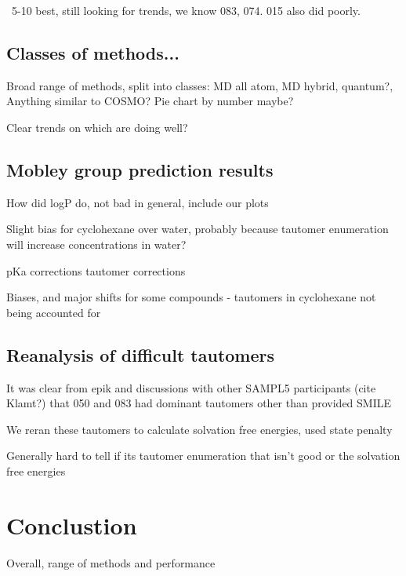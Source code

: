 ~5-10 best, still looking for trends, we know 083, 074. 015 also did poorly. 


\subsection{Classes of methods...}
\label{results:4}
Broad range of methods, split into classes: MD all atom, MD hybrid, quantum?, Anything similar to COSMO? %
Pie chart by number maybe?

Clear trends on which are doing well? 

\subsection{Mobley group prediction results}
\label{results:5}
How did logP do, not bad in general, include our plots

Slight bias for cyclohexane over water, probably because tautomer enumeration will increase concentrations in water?

pKa corrections
tautomer corrections

Biases, and major shifts for some compounds - tautomers in cyclohexane not being accounted for

\subsection{Reanalysis of difficult tautomers} %
\label{results:6}
It was clear from epik and discussions with other SAMPL5 participants (cite Klamt?)  that 050 and 083 had dominant tautomers other than provided SMILE

We reran these tautomers to calculate solvation free energies, used state penalty %

Generally hard to tell if its tautomer enumeration that isn't good or the solvation free energies

\section{Conclustion}
\label{conclusions}

Overall, range of methods and performance

